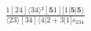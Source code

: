 \documentclass[varwidth, border=5pt]{standalone}
\begin{document}
\begin{my}
$\begin{gathered}
\scriptscriptstyle\frac{1[24]⟨34⟩²[𝟓1][1|𝟓|𝟓⟩}{⟨23⟩[34]⟨4|2+3|1]s_{234}}
\end{gathered}$
\end{my}
\end{document}
